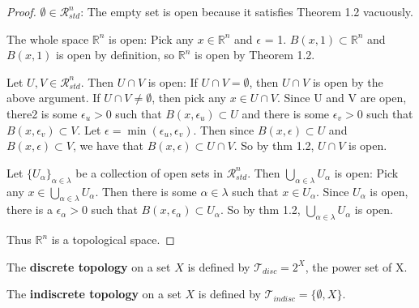 \begin {proof}
$\emptyset \in \mathcal{R}_{std}^n$:
The empty set is open because it satisfies Theorem 1.2 vacuously.

The whole space $\mathbb{R}^n$ is open:
Pick any $x \in \mathbb{R}^n$ and $\epsilon$ = 1.
$B(x, 1) \subset \mathbb{R}^n$ and $B(x, 1)$ is open by definition, so $\mathbb{R}^n$ is open by Theorem 1.2.

Let $U, V \in \mathcal{R}_{std}^n$.
Then $U \cap V$ is open:
If $U \cap V = \emptyset$, then $U \cap V$ is open by the above argument.
If $U \cap V \neq \emptyset$, then pick any $x \in U \cap V$.
Since U and V are open, there2 is some $\epsilon_u > 0$ such that $B(x, \epsilon_u) \subset U$ and there is some $\epsilon_v > 0$ such that $B(x, \epsilon_v) \subset V$.
Let $\epsilon = \min(\epsilon_u, \epsilon_v)$.
Then since $B(x, \epsilon) \subset U$ and $B(x, \epsilon) \subset V$, we have that $B(x, \epsilon) \subset U \cap V$.
So by thm 1.2, $U \cap V$ is open.

Let $\{U_{\alpha}\}_{\alpha \in \lambda}$ be a collection of open sets in $\mathcal{R}_{std}^n$.
Then $\bigcup_{\alpha \in \lambda} U_{\alpha}$ is open:
Pick any $x \in \bigcup_{\alpha \in \lambda} U_{\alpha}$.
Then there is some $\alpha \in \lambda$ such that $x \in U_{\alpha}$.
Since $U_{\alpha}$ is open, there is a $\epsilon_{\alpha} > 0$ such that $B(x, \epsilon_{\alpha}) \subset U_{\alpha}$.
So by thm 1.2, $\bigcup_{\alpha \in \lambda} U_{\alpha}$ is open.

Thus $\mathbb{R}^n$ is a topological space.
\end {proof}

\begin {definition}  \label {def:discretetopology}
The \textbf{discrete topology} on a set $X$ is defined by $\mathcal{T}_{disc} = 2^X$, the power set of X.
\end {definition}

\begin {definition}  \label {def:indiscretetopology}
The \textbf{indiscrete topology} on a set $X$ is defined by $\mathcal{T}_{indisc} = \{ \emptyset, X \}$.
\end {definition}


